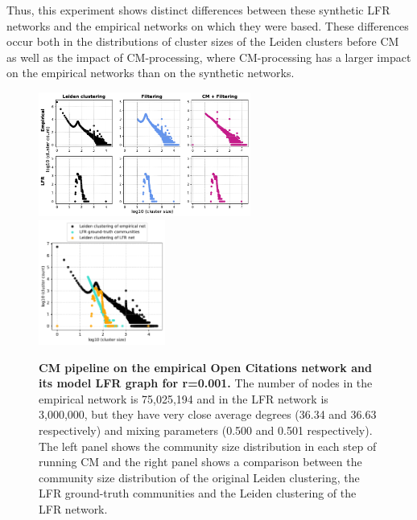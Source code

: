 \documentclass[11pt]{article}   	%
\begin{document}
Thus, this experiment shows distinct differences between these synthetic LFR networks and the empirical networks on which they were based.
These differences occur both in the distributions of cluster sizes of the Leiden clusters before CM as well as the impact of CM-processing, where CM-processing has a larger impact on the empirical networks than on the synthetic networks.






\begin{figure}[h!]
\centering
\includegraphics[width=0.62\textwidth]{figs/oc_cm_steps_lfr001.pdf}
\includegraphics[width=0.37\textwidth]{figs/oc_001_cm_size.pdf}
\caption[CM pipeline on the empirical Open Citations network and its model LFR graph for r=0.001]{\textbf{CM pipeline on the empirical Open Citations network and its model LFR graph for r=0.001.} The number of nodes in the empirical network is 75,025,194 and in the LFR network is 3,000,000, but they have very close average degrees (36.34 and 36.63 respectively) and mixing parameters (0.500 and 0.501 respectively). The left panel shows the community size distribution in each step of running CM and the right panel shows a comparison between the community size distribution of the original Leiden clustering, the LFR ground-truth communities and the Leiden clustering of the LFR network.}
\label{fig:oc-cm-lfr-001}
\end{figure}
\end{document}
